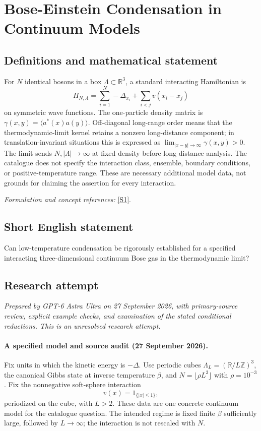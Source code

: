 \documentclass[11pt]{article}
\begin{document}
\section*{\texorpdfstring{Bose-Einstein Condensation in Continuum Models}{Bose-Einstein Condensation in Continuum Models}}\label{7800013}
\subsection{Definitions and mathematical statement}
For $N$ identical bosons in a box $\Lambda\subset{\mathbb{R}}^3$, a standard interacting Hamiltonian is
\[
 H_{N,\Lambda}=\sum_{i=1}^N-\Delta_{x_i}+\sum_{i<j}v(x_i-x_j)
\]
on symmetric wave functions. The one-particle density matrix is $\gamma(x,y)=\langle a^*(x)a(y)\rangle$. Off-diagonal long-range order means that the thermodynamic-limit kernel retains a nonzero long-distance component; in translation-invariant situations this is expressed as $\lim_{|x-y|\to\infty}\gamma(x,y)>0$. The limit sends $N,|\Lambda|\to\infty$ at fixed density before long-distance analysis. The catalogue does not specify the interaction class, ensemble, boundary conditions, or positive-temperature range. These are necessary additional model data, not grounds for claiming the assertion for every interaction.
\par\smallskip\textit{Formulation and concept references:} \href{https://doi.org/10.1007/3-7643-7338-9}{[S1]}.

\subsection{Short English statement}
Can low-temperature condensation be rigorously established for a specified interacting three-dimensional continuum Bose gas in the thermodynamic limit?
\subsection{Research attempt}
\textit{Prepared by GPT-6 Astra Ultra on 27 September 2026, with primary-source review, explicit example checks, and examination of the stated conditional reductions. This is an unresolved research attempt.}

\paragraph{A specified model and source audit (27 September 2026).}
Fix units in which the kinetic energy is $-\Delta$. Use periodic cubes
$\Lambda_L=(\mathbb R/L\mathbb Z)^3$, the canonical Gibbs state at
inverse temperature $\beta$, and $N=\lfloor\rho L^3\rfloor$ with
$\rho=10^{-3}$. Fix the nonnegative soft-sphere interaction
\[
 v(x)=1_{\{|x|\le1\}},
\]
periodized on the cube, with $L>2$. These data are one concrete
continuum model for the catalogue question. The intended regime is
fixed finite $\beta$ sufficiently large, followed by $L\to\infty$;
the interaction is not rescaled with $N$.
\end{document}
